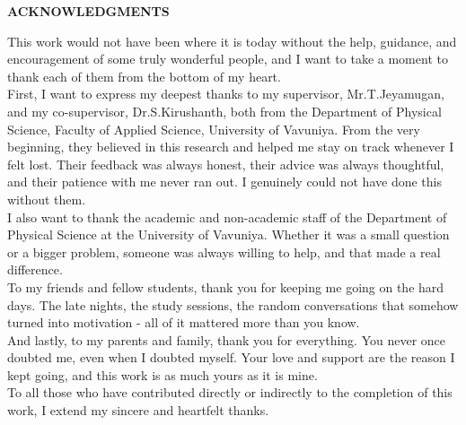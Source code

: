 \begin{center}
    \textbf{\LARGE ACKNOWLEDGMENTS}\\[40pt]
\end{center}

\noindent This work would not have been where it is today without the help, guidance, and encouragement of some truly wonderful people, and I want to take a moment to thank each of them from the bottom of my heart.\\

\noindent First, I want to express my deepest thanks to my supervisor, Mr.T.Jeyamugan, and my co-supervisor, Dr.S.Kirushanth, both from the Department of Physical Science, Faculty of Applied Science, University of Vavuniya. From the very beginning, they believed in this research and helped me stay on track whenever I felt lost. Their feedback was always honest, their advice was always thoughtful, and their patience with me never ran out. I genuinely could not have done this without them.\\

\noindent I also want to thank the academic and non-academic staff of the Department of Physical Science at the University of Vavuniya. Whether it was a small question or a bigger problem, someone was always willing to help, and that made a real difference.\\

\noindent To my friends and fellow students, thank you for keeping me going on the hard days. The late nights, the study sessions, the random conversations that somehow turned into motivation - all of it mattered more than you know.\\

\noindent And lastly, to my parents and family, thank you for everything. You never once doubted me, even when I doubted myself. Your love and support are the reason I kept going, and this work is as much yours as it is mine.\\

\noindent To all those who have contributed directly or indirectly to the completion of this work, I extend my sincere and heartfelt thanks. 